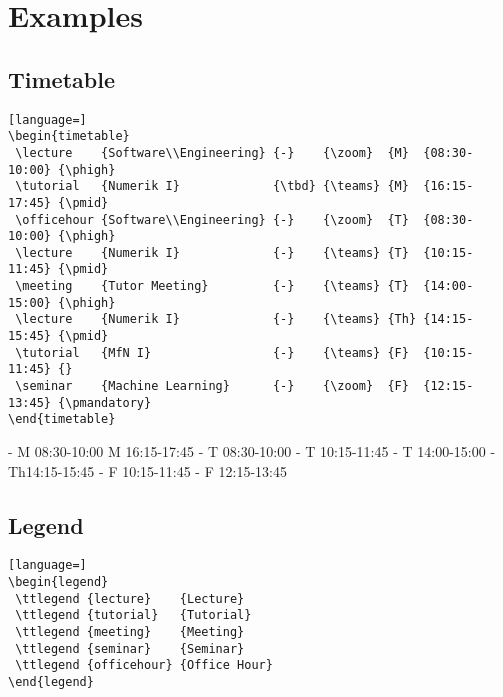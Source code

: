 \documentclass[english]{article}
\begin{document}
	\pagebreak
	\section{Examples}
	\subsection{Timetable}
	\begin{lstlisting}[language=]
\begin{timetable}			
 \lecture    {Software\\Engineering} {-}    {\zoom}  {M}  {08:30-10:00} {\phigh}		
 \tutorial   {Numerik I}             {\tbd} {\teams} {M}  {16:15-17:45} {\pmid}
 \officehour {Software\\Engineering} {-}    {\zoom}  {T}  {08:30-10:00} {\phigh}	
 \lecture    {Numerik I}             {-}    {\teams} {T}  {10:15-11:45} {\pmid}	
 \meeting    {Tutor Meeting}         {-}    {\teams} {T}  {14:00-15:00} {\phigh}	
 \lecture    {Numerik I}             {-}    {\teams} {Th} {14:15-15:45} {\pmid}	
 \tutorial   {MfN I}                 {-}    {\teams} {F}  {10:15-11:45} {}
 \seminar    {Machine Learning}      {-}    {\zoom}  {F}  {12:15-13:45} {\pmandatory}	
\end{timetable}		
	\end{lstlisting}	
	\begin{timetable}			
						{-}		{\teams}			{M}	{08:30-10:00}	{\phigh}		
									{\tbd}	{\teams}			{M}	{16:15-17:45}	{\pmid}
						{-}		{\teams}			{T}	{08:30-10:00}	{\phigh}	
									{-}		{\teams}			{T}	{10:15-11:45}	{\pmid}	
								{-}		{\teams}			{T}	{14:00-15:00}	{\phigh}	
									{-}		{\teams}			{Th}{14:15-15:45}	{\pmid}	
										{-}		{\teams}			{F}	{10:15-11:45}	{}
							{-}		{\teams}			{F}	{12:15-13:45}	{\pmandatory}	
	\end{timetable}
	
	\pagebreak
	\subsection{Legend}
	\begin{lstlisting}[language=]
\begin{legend}
 \ttlegend {lecture}    {Lecture}
 \ttlegend {tutorial}   {Tutorial}
 \ttlegend {meeting}    {Meeting}
 \ttlegend {seminar}    {Seminar}
 \ttlegend {officehour} {Office Hour}
\end{legend}		
	\end{lstlisting}
	\begin{legend}
	\end{legend}
	
\end{document}
